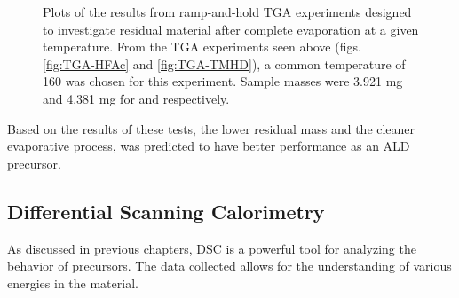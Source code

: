 \begin{figure}[tbp]
   \centering
	\hspace{1cm}
   \caption[Constant Temperature TGA Experiments]%
   		{Plots of the results from ramp-and-hold TGA experiments designed to investigate residual material %
		after complete evaporation at a given temperature. From the TGA experiments seen above (figs.~%
		\vref{fig:TGA-HFAc} and \vref{fig:TGA-TMHD}), a common temperature of 160\degC{} was chosen %
		for this experiment. Sample masses were 3.921 mg and 4.381 mg for \HFAc{} and \TMHD{} respectively.}
   \label{fig:TGA-Hold}
\end{figure}

Based on the results of these tests, the lower residual mass and the cleaner evaporative process, \TMHD{} was predicted to have better performance as an ALD precursor. 


\subsection{Differential Scanning Calorimetry}

As discussed in previous chapters, DSC is a powerful tool for analyzing the behavior of precursors. The data collected allows for the understanding of various energies in the material. 

